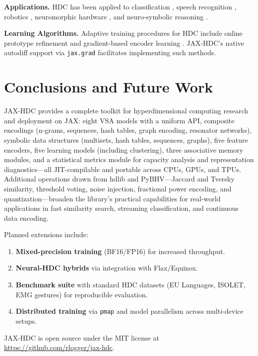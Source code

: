 \documentclass[twoside,11pt]{article}
\begin{document}
\textbf{Applications.} HDC has been applied to classification \citep{rahimi2016robust}, speech recognition \citep{imani2017voicehd}, robotics \citep{neubert2019introduction}, neuromorphic hardware \citep{kleyko2022vector}, and neuro-symbolic reasoning \citep{hersche2023neuro}.

\textbf{Learning Algorithms.} Adaptive training procedures for HDC include online prototype refinement \citep{imani2021onlinehd} and gradient-based encoder learning \citep{kim2024flash}. JAX-HDC's native autodiff support via \texttt{jax.grad} facilitates implementing such methods.

\section{Conclusions and Future Work}
\label{sec:conclusion}

JAX-HDC provides a complete toolkit for hyperdimensional computing research and deployment on JAX: eight VSA models with a uniform API, composite encodings (n-grams, sequences, hash tables, graph encoding, resonator networks), symbolic data structures (multisets, hash tables, sequences, graphs), five feature encoders, five learning models (including clustering), three associative memory modules, and a statistical metrics module for capacity analysis and representation diagnostics---all JIT-compilable and portable across CPUs, GPUs, and TPUs. Additional operations drawn from hdlib and PyBHV---Jaccard and Tversky similarity, threshold voting, noise injection, fractional power encoding, and quantization---broaden the library's practical capabilities for real-world applications in fast similarity search, streaming classification, and continuous data encoding.

Planned extensions include:

\begin{enumerate}
\item \textbf{Mixed-precision training} (BF16/FP16) for increased throughput.
\item \textbf{Neural-HDC hybrids} via integration with Flax/Equinox.
\item \textbf{Benchmark suite} with standard HDC datasets (EU Languages, ISOLET, EMG gestures) for reproducible evaluation.
\item \textbf{Distributed training} via \texttt{pmap} and model parallelism across multi-device setups.
\end{enumerate}

JAX-HDC is open source under the MIT license at \url{https://github.com/rlogger/jax-hdc}.
\end{document}
